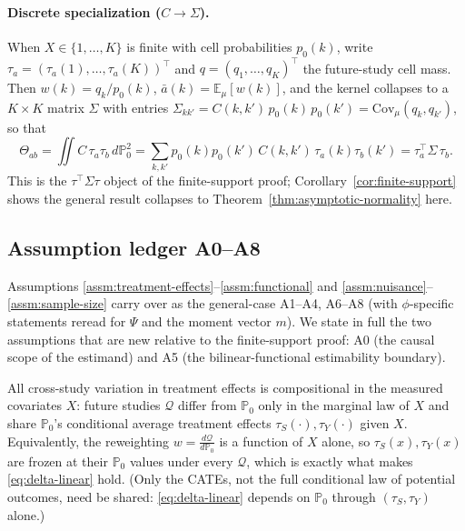 \paragraph{Discrete specialization ($C\to\Sigma$).}
When $X\in\{1,\dots,K\}$ is finite with cell probabilities $p_0(k)$, write
$\tau_a=(\tau_a(1),\dots,\tau_a(K))^\top$ and $q=(q_1,\dots,q_K)^\top$ the future-study cell
mass. Then $w(k)=q_k/p_0(k)$, $\bar{a}(k)=\mathbb{E}_\mu[w(k)]$, and the kernel collapses to a
$K\times K$ matrix $\Sigma$ with entries
$\Sigma_{kk'} = C(k,k')\,p_0(k)\,p_0(k')=\mathrm{Cov}_\mu(q_k,q_{k'})$, so that
\begin{equation}
\Theta_{ab} = \iint C\,\tau_a\tau_b\,d\mathbb{P}_0^2
            = \sum_{k,k'} p_0(k)p_0(k')\,C(k,k')\,\tau_a(k)\tau_b(k')
            = \tau_a^\top \Sigma\, \tau_b .
\label{eq:discrete-quadform}
\end{equation}
This is the $\tau^\top\Sigma\tau$ object of the finite-support proof; Corollary~\ref{cor:finite-support}
shows the general result collapses to Theorem~\ref{thm:asymptotic-normality} here.

\subsection{Assumption ledger A0--A8}
\label{subsec:assumptions-A}

Assumptions \ref{assm:treatment-effects}--\ref{assm:functional} and
\ref{assm:nuisance}--\ref{assm:sample-size} carry over as the general-case A1--A4, A6--A8
(with $\phi$-specific statements reread for $\Psi$ and the moment vector $m$). We state in full
the two assumptions that are new relative to the finite-support proof: A0 (the causal scope of
the estimand) and A5 (the bilinear-functional estimability boundary).

\begin{assumption}
\label{assm:A0-transport}
All cross-study variation in treatment effects is compositional in the measured covariates
$X$: future studies $\mathcal{Q}$ differ from $\mathbb{P}_0$ only in the marginal law of $X$
and share $\mathbb{P}_0$'s conditional average treatment effects $\tau_S(\cdot),\tau_Y(\cdot)$
given $X$. Equivalently, the reweighting $w=\tfrac{d\mathcal{Q}}{d\mathbb{P}_0}$ is a function
of $X$ alone, so $\tau_S(x),\tau_Y(x)$ are frozen at their $\mathbb{P}_0$ values under every
$\mathcal{Q}$, which is exactly what makes \eqref{eq:delta-linear} hold. (Only the CATEs, not
the full conditional law of potential outcomes, need be shared: \eqref{eq:delta-linear} depends
on $\mathbb{P}_0$ through $(\tau_S,\tau_Y)$ alone.)
\end{assumption}

